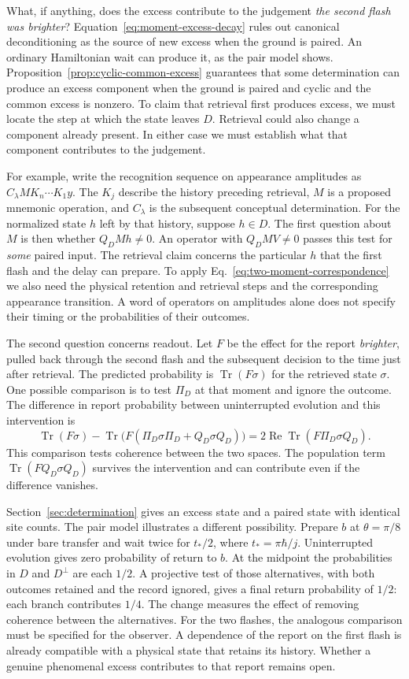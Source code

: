 \documentclass[11pt]{article}
\theoremstyle{definition}
\DeclareMathOperator{\Tr}{Tr}
\begin{document}
What, if anything, does the excess contribute to the judgement \emph{the second flash was brighter}? Equation~\eqref{eq:moment-excess-decay} rules out canonical deconditioning as the source of new excess when the ground is paired. An ordinary Hamiltonian wait can produce it, as the pair model shows. Proposition~\ref{prop:cyclic-common-excess} guarantees that some determination can produce an excess component when the ground is paired and cyclic and the common excess is nonzero. To claim that retrieval first produces excess, we must locate the step at which the state leaves $D$. Retrieval could also change a component already present. In either case we must establish what that component contributes to the judgement.

For example, write the recognition sequence on appearance amplitudes as $C_\lambda M K_n\cdots K_1 y$. The $K_j$ describe the history preceding retrieval, $M$ is a proposed mnemonic operation, and $C_\lambda$ is the subsequent conceptual determination. For the normalized state $h$ left by that history, suppose $h\in D$. The first question about $M$ is then whether $Q_D M h\ne0$. An operator with $Q_D MV\ne0$ passes this test for \emph{some} paired input. The retrieval claim concerns the particular $h$ that the first flash and the delay can prepare. To apply Eq.~\eqref{eq:two-moment-correspondence} we also need the physical retention and retrieval steps and the corresponding appearance transition. A word of operators on amplitudes alone does not specify their timing or the probabilities of their outcomes.

The second question concerns readout. Let $F$ be the effect for the report \emph{brighter}, pulled back through the second flash and the subsequent decision to the time just after retrieval. The predicted probability is $\Tr(F\sigma)$ for the retrieved state $\sigma$. One possible comparison is to test $\Pi_D$ at that moment and ignore the outcome. The difference in report probability between uninterrupted evolution and this intervention is
\[
 \Tr(F\sigma)-\Tr\bigl(F(\Pi_D\sigma\Pi_D+Q_D\sigma Q_D)\bigr)
   =2\operatorname{Re}\Tr(F\Pi_D\sigma Q_D).
\]
This comparison tests coherence between the two spaces. The population term $\Tr(FQ_D\sigma Q_D)$ survives the intervention and can contribute even if the difference vanishes.

Section~\ref{sec:determination} gives an excess state and a paired state with identical site counts. The pair model illustrates a different possibility. Prepare $b$ at $\theta=\pi/8$ under bare transfer and wait twice for $t_*/2$, where $t_*=\pi\hbar/j$. Uninterrupted evolution gives zero probability of return to $b$. At the midpoint the probabilities in $D$ and $D^\perp$ are each $1/2$. A projective test of those alternatives, with both outcomes retained and the record ignored, gives a final return probability of $1/2$: each branch contributes $1/4$. The change measures the effect of removing coherence between the alternatives. For the two flashes, the analogous comparison must be specified for the observer. A dependence of the report on the first flash is already compatible with a physical state that retains its history. Whether a genuine phenomenal excess contributes to that report remains open.
\end{document}
